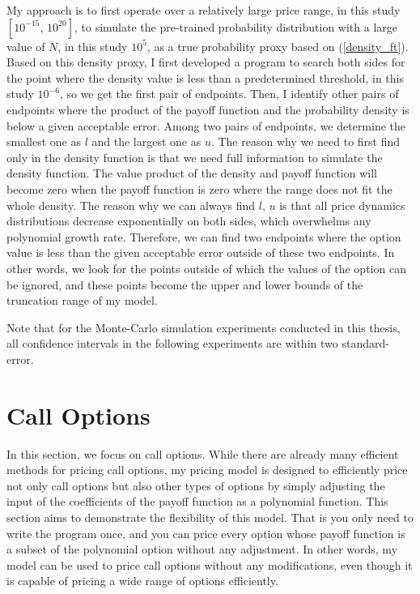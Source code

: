 My approach is to first operate over a relatively large price range, in this study $\left[10^{-15}, \,10^{20}\right]$, to simulate the pre-trained probability distribution with a large value of $N$, in this study $10^5$, as a true probability proxy based on (\ref{density_ft}). Based on this density proxy, I first developed a program to search both sides for the point where the density value is less than a predetermined threshold, in this study $10^{-6}$, so we get the first pair of endpoints. Then, I identify other pairs of endpoints where the product of the payoff function and the probability density is below a given acceptable error. Among two pairs of endpoints, we determine the smallest one as $l$ and the largest one as $u$. The reason why we need to first find only in the density function is that we need full information to simulate the density function. The value product of the density and payoff function will become zero when the payoff function is zero where the range does not fit the whole density. The reason why we can always find $l$, $u$ is that all price dynamics distributions decrease exponentially on both sides, which overwhelms any polynomial growth rate. Therefore, we can find two endpoints where the option value is less than the given acceptable error outside of these two endpoints. In other words, we look for the points outside of which the values of the option can be ignored, and these points become the upper and lower bounds of the truncation range of my model.

Note that for the Monte-Carlo simulation experiments conducted in this thesis, all confidence intervals in the following experiments are within two standard-error.
\section{Call Options}
In this section, we focus on call options. While there are already many efficient methods for pricing call options, my pricing model is designed to efficiently price not only call options but also other types of options by simply adjusting the input of the coefficients of the payoff function as a polynomial function. This section aims to demonstrate the flexibility of this model. That is you only need to write the program once, and you can price every option whose payoff function is a subset of the polynomial option without any adjustment. In other words, my model can be used to price call options without any modifications, even though it is capable of pricing a wide range of options efficiently. 

